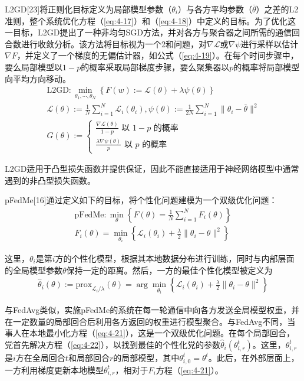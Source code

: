L2GD[23]将正则化目标定义为局部模型参数（$\theta_{i}$）与各方平均参数（$\bar{\theta}$）之差的L2准则，整个系统优化方程（\ref{eq:4-17}）和（\ref{eq:4-18}）中定义的目标。为了优化这一目标，L2GD提出了一种非均匀SGD方法，并对各方与聚合器之间所需的通信回合数进行收敛分析。该方法将目标视为一个2和问题，对$\nabla \mathcal{L}$或$\nabla \psi$进行采样以估计$\nabla F$，并定义了一个梯度的无偏估计器，如公式（\ref{eq:4-19}）。在每个时间步骤中，要么局部模型以$1-p$的概率采取局部梯度步骤，要么聚集器以$p$的概率将局部模型向平均方向移动。
\begin{align}
	\text{L2GD}: \min_{\theta_{1}, \cdots, \theta_{N}} \left\{ F(w) := \mathcal{L}(\theta) + \lambda \psi(\theta) \right\} \label{eq:4-17} \\
	\mathcal{L}(\theta) := \frac{1}{N} \sum_{i=1}^{N} \mathcal{L}_{i}(\theta_{i}), \psi(\theta) := \frac{1}{2N} \sum_{i=1}^{N} \|\theta_{i} - \bar{\theta}\|^{2} \label{eq:4-18} \\
	G(\theta) := \left\{
		\begin{matrix}
			\frac{\nabla \mathcal{L}(\theta)}{1 - p} \text{ 以 } 1 - p \text{ 的概率} \\
			\frac{\lambda \nabla \psi(\theta)}{p} \text{ 以 } p \text{ 的概率}
		\end{matrix}
	\right. \label{eq:4-19}
\end{align}

L2GD适用于凸型损失函数并提供保证，因此不能直接适用于神经网络模型中通常遇到的非凸型损失函数。

pFedMe[16]通过定义如下的目标，将个性化问题建模为一个双级优化问题：
\begin{align}
	\text{pFedMe}: \min_{\theta} \left\{ F(\theta) = \frac{1}{N} \sum_{i=1}^{N}F_{i}(\theta) \right\} \label{eq:4-20} \\
	F_{i}(\theta) = \min_{\theta_{i}} \left\{ \mathcal{L}_{i}(\theta_{i}) + \frac{\lambda}{2}\|\theta_{i} - \theta\|^{2} \right\} \label{eq:4-21}
\end{align}

这里，$\theta_{i}$是第$i$方的个性化模型，根据其本地数据分布进行训练，同时与内部层面的全局模型参数$\theta$保持一定的距离。然后，一方的最佳个性化模型被定义为
\begin{align}
	\hat{\theta}_{i}(\theta) := \text{prox}_{\mathcal{L}_{i} / \lambda}(\theta) = \arg \min_{\theta_{i}} \left\{ \mathcal{L}_{i}(\theta_{i}) + \frac{\lambda}{2} \|\theta_{i} - \theta\|^{2} \right\} \label{eq:4-22}
\end{align}

与FedAvg类似，实施pFedMe的系统在每一轮通信中向各方发送全局模型权重，并在一定数量的局部回合后利用各方返回的权重进行模型聚合。与FedAvg不同，当事人在本地最小化方程（\ref{eq:4-21}），这是一个双级优化问题。在每个局部回合，党首先解决方程（\ref{eq:4-22}），以找到最佳的个性化党的参数$\hat{\theta}_{i}(\theta_{i, r}^{t})$。这里，$\theta_{i, r}^{t}$是$i$方在全局回合$t$和局部回合$r$的局部模型，其中$\theta_{i, 0}^{t} = \theta^{t}$。此后，在外部层面上，一方利用梯度更新本地模型$\theta_{i, r}^{t}$，相对于$F_{i}$方程（\ref{eq:4-21}）。

